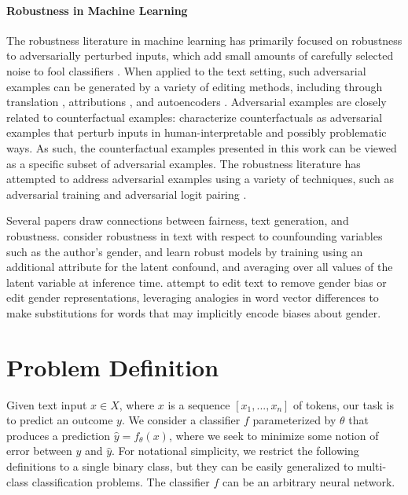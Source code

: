 \documentclass[letterpaper]{article} %
\theoremstyle{definition}
\begin{document}
\paragraph{Robustness in Machine Learning} The robustness literature in machine learning has primarily focused on robustness to adversarially perturbed inputs, which add small amounts of carefully selected noise to fool classifiers \cite{Goodfellow15}. When applied to the text setting, such adversarial examples can be generated by a variety of editing methods, including through translation \cite{SEAR}, attributions \cite{Mud18}, and autoencoders  \cite{GNAE} \cite{Hu17}. Adversarial examples are closely related to counterfactual examples: \citeauthor{Wachter17} characterize counterfactuals as adversarial examples that perturb inputs in human-interpretable and possibly problematic ways. As such, the counterfactual examples presented in this work can be viewed as a specific subset of adversarial examples. The robustness literature has attempted to address adversarial examples using a variety of techniques, such as adversarial training \cite{Madry17,Goodfellow15} and adversarial logit pairing \cite{ALP}. 

Several papers draw connections between fairness, text generation, and robustness. \citeauthor{TEXT_ROBUST} consider robustness in text with respect to counfounding variables such as the author's gender, and learn robust models by training using an additional attribute for the latent confound, and averaging over all values of the latent variable at inference time. \citeauthor{Madaan18} attempt to edit text to remove gender bias or edit gender representations, leveraging analogies in word vector differences to make substitutions for words that may implicitly encode biases about gender. 

\section{Problem Definition}
Given text input $x \in X$, where $x$ is a sequence $[x_1, ..., x_n]$ of tokens, our task is to predict an outcome $y$. We consider a classifier $f$ parameterized by $\theta$ that produces a prediction $\hat{y} = f_\theta(x)$, where we seek to minimize some notion of error between $y$ and $\hat{y}$. For notational simplicity, we restrict the following definitions to a single binary class, but they can be easily generalized to multi-class classification problems. The classifier $f$ can be an arbitrary neural network.
\end{document}
